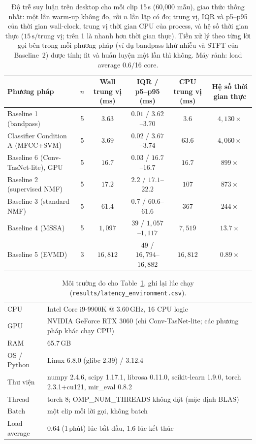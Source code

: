 \documentclass[11pt]{article}
\begin{document}
\begin{table}[H]
\centering
\caption{Độ trễ suy luận trên desktop cho mỗi clip 15\,s (60{,}000 mẫu), giao thức thống nhất: một lần warm-up không đo, rồi $n$ lần lặp có đo; trung vị, IQR và p5--p95 của thời gian wall-clock, trung vị thời gian CPU của process, và hệ số thời gian thực ($15\,\text{s}/\text{trung vị}$; trên 1 là nhanh hơn thời gian thực). Tiền xử lý theo từng lời gọi bên trong mỗi phương pháp (ví dụ bandpass khử nhiễu và STFT của Baseline~2) được tính; fit và huấn luyện một lần thì không. Máy rảnh: load average $0.6$/16 core.}
\label{tab:latency}
\small
\begin{tabular}{@{}lccccc@{}}
\toprule
Phương pháp & $n$ & Wall trung vị (ms) & IQR / p5--p95 (ms) & CPU trung vị (ms) & Hệ số thời gian thực \\
\midrule
Baseline 1 (bandpass)            & 5 & $3.63$    & $0.01$ / $3.62$--$3.70$     & $3.6$    & $4{,}130\times$ \\
Classifier Condition A (MFCC+SVM) & 5 & $3.69$   & $0.02$ / $3.67$--$3.74$     & $63.6$   & $4{,}060\times$ \\
Baseline 6 (Conv-TasNet-lite), GPU & 5 & $16.7$  & $0.03$ / $16.7$--$16.7$     & $16.7$   & $899\times$ \\
Baseline 2 (supervised NMF)      & 5 & $17.2$    & $2.2$ / $17.1$--$22.2$      & $107$    & $873\times$ \\
Baseline 3 (standard NMF)        & 5 & $61.4$    & $0.7$ / $60.6$--$61.6$      & $367$    & $244\times$ \\
Baseline 4 (MSSA)                & 5 & $1{,}097$ & $39$ / $1{,}057$--$1{,}117$ & $7{,}519$ & $13.7\times$ \\
Baseline 5 (EVMD)                & 3 & $16{,}812$ & $49$ / $16{,}794$--$16{,}882$ & $16{,}812$ & $0.89\times$ \\
\bottomrule
\end{tabular}
\end{table}

\begin{table}[H]
\centering
\caption{Môi trường đo cho Table~\ref{tab:latency}, ghi lại lúc chạy (\texttt{results/latency\_environment.csv}).}
\label{tab:latencyenv}
\small
\begin{tabular}{@{}ll@{}}
\toprule
CPU & Intel Core i9-9900K @ 3.60\,GHz, 16 CPU logic \\
GPU & NVIDIA GeForce RTX 3060 (chỉ Conv-TasNet-lite; các phương pháp khác chạy CPU) \\
RAM & 65.7\,GB \\
OS / Python & Linux 6.8.0 (glibc 2.39) / 3.12.4 \\
Thư viện & numpy 2.4.6, scipy 1.17.1, librosa 0.11.0, scikit-learn 1.9.0, torch 2.3.1+cu121, mir\_eval 0.8.2 \\
Thread & torch 8; OMP\_NUM\_THREADS không đặt (mặc định BLAS) \\
Batch & một clip mỗi lời gọi, không batch \\
Load average & $0.64$ (1\,phút) lúc bắt đầu, $1.6$ lúc kết thúc \\
\bottomrule
\end{tabular}
\end{table}
\end{document}
